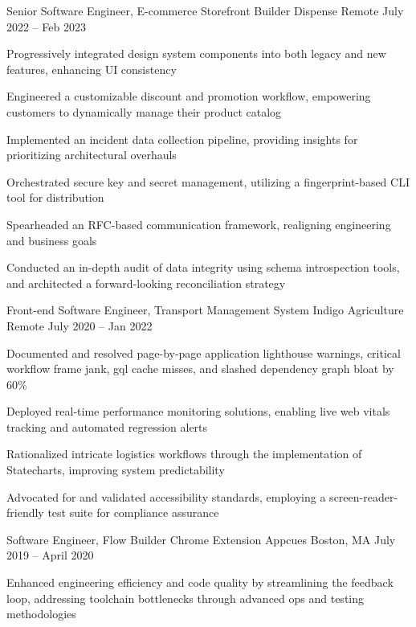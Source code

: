 \documentclass[]{awesome-cv}
\begin{document}
\begin{cventries}
	\cventry
	{Senior Software Engineer, E-commerce Storefront Builder}
	{Dispense}
	{Remote}
	{July 2022 – Feb 2023}
	{\begin{cvitems}
		\item {Progressively integrated design system components into both legacy and new features, enhancing UI consistency}
		\item {Engineered a customizable discount and promotion workflow, empowering customers to dynamically manage their product catalog}
		\item {Implemented an incident data collection pipeline, providing insights for prioritizing architectural overhauls}
		\item {Orchestrated secure key and secret management, utilizing a fingerprint-based CLI tool for distribution}
		\item {Spearheaded an RFC-based communication framework, realigning engineering and business goals}
		\item {Conducted an in-depth audit of data integrity using schema introspection tools, and architected a forward-looking reconciliation strategy}
		\end{cvitems}}
	\cventry
	{Front-end Software Engineer, Transport Management System}
	{Indigo Agriculture}
	{Remote}
	{July 2020 – Jan 2022}
	{\begin{cvitems}
		\item {Documented and resolved page-by-page application lighthouse warnings, critical workflow frame jank, gql cache misses, and slashed dependency graph bloat by 60\%}
		\item {Deployed real-time performance monitoring solutions, enabling live web vitals tracking and automated regression alerts}
		\item {Rationalized intricate logistics workflows through the implementation of Statecharts, improving system predictability}
		\item {Advocated for and validated accessibility standards, employing a screen-reader-friendly test suite for compliance assurance}
		\end{cvitems}}
	\cventry
	{Software Engineer, Flow Builder Chrome Extension}
	{Appcues}
	{Boston, MA}
	{July 2019 – April 2020}
	{\begin{cvitems}
		\item {Enhanced engineering efficiency and code quality by streamlining the feedback loop, addressing toolchain bottlenecks through advanced ops and testing methodologies}

\end{cvitems}}
\end{cventries}
\end{document}
